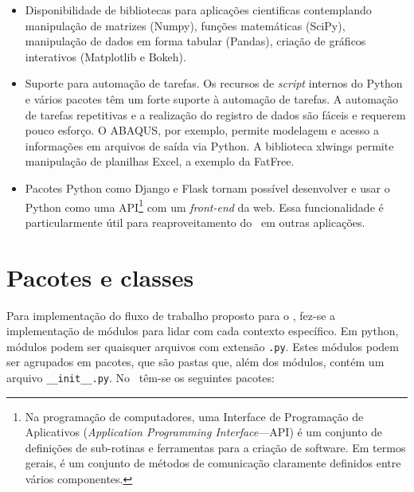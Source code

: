 \begin{itemize}
    \item Disponibilidade de bibliotecas para aplicações cientificas contemplando manipulação de matrizes (Numpy), funções matemáticas (SciPy), manipulação de dados em forma tabular (Pandas), criação de gráficos interativos (Matplotlib e Bokeh).

    \item Suporte para automação de tarefas. Os recursos de \textit{script} internos do Python e vários pacotes têm um forte suporte à automação de tarefas. A automação de tarefas repetitivas e a realização do registro de dados são fáceis e requerem pouco esforço. O ABAQUS, por exemplo, permite modelagem e acesso a informações em arquivos de saída via Python. A biblioteca xlwings permite manipulação de planilhas Excel, a exemplo da FatFree.

    \item Pacotes Python como Django e Flask tornam possível desenvolver e usar o Python como uma API\footnote{Na programação de computadores, uma Interface de Programação de Aplicativos (\textit{Application Programming Interface}---API) é um conjunto de definições de sub-rotinas e ferramentas para a criação de software. Em termos gerais, é um conjunto de métodos de comunicação claramente definidos entre vários componentes.} com um \textit{front-end} da web. Essa funcionalidade é particularmente útil para reaproveitamento do \frame\  em outras aplicações.
\end{itemize}


\section{Pacotes e classes}


Para implementação do fluxo de trabalho proposto para o \frame, fez-se a implementação de módulos para lidar com cada contexto específico. Em python, módulos podem ser quaisquer arquivos com extensão \texttt{.py}. Estes módulos podem ser agrupados em pacotes, que são pastas que, além dos módulos, contém um arquivo \texttt{\_\_init\_\_.py}. No \frame\ têm-se os seguintes pacotes: %


